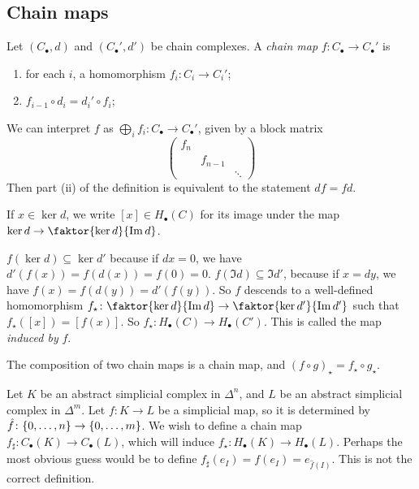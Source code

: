 \subsection{Chain maps}
\begin{definition}
	Let \( (C_\bullet, d) \) and \( (C_\bullet', d') \) be chain complexes.
	A \emph{chain map} \( f \colon C_\bullet \to C_\bullet' \) is
	\begin{enumerate}
		\item for each \( i \), a homomorphism \( f_i \colon C_i \to C_i' \);
		\item \( f_{i-1} \circ d_i = d_i' \circ f_i \);
	\end{enumerate}
\end{definition}
\begin{remark}
	We can interpret \( f \) as \( \bigoplus_i f_i \colon C_\bullet \to C_\bullet' \), given by a block matrix
	\[ \begin{pmatrix}
		f_n \\
		& f_{n-1} \\
		& & \ddots
	\end{pmatrix} \]
	Then part (ii) of the definition is equivalent to the statement \( d f = f d \).
\end{remark}
If \( x \in \ker d \), we write \( [x] \in H_\bullet(C) \) for its image under the map \( \ker d \to \faktor{\ker d}{\Im d} \).
\begin{remark}
	\( f(\ker d) \subseteq \ker d' \) because if \( dx = 0 \), we have \( d'(f(x)) = f(d(x)) = f(0) = 0 \).
	\( f(\Im d) \subseteq \Im d' \), because if \( x = dy \), we have \( f(x) = f(d(y)) = d'(f(y)) \).
	So \( f \) descends to a well-defined homomorphism \( f_\star \colon \faktor{\ker d}{\Im d} \to \faktor{\ker d'}{\Im d'} \) such that \( f_\star([x]) = [f(x)] \).
	So \( f_\star \colon H_\bullet(C) \to H_\bullet(C') \).
	This is called the map \emph{induced by} \( f \).
\end{remark}
\begin{remark}
	The composition of two chain maps is a chain map, and \( (f \circ g)_\star = f_\star \circ g_\star \).
\end{remark}
Let \( K \) be an abstract simplicial complex in \( \Delta^n \), and \( L \) be an abstract simplicial complex in \( \Delta^m \).
Let \( f \colon K \to L \) be a simplicial map, so it is determined by \( \hat f \colon \qty{0, \dots, n} \to \qty{0, \dots, m} \).
We wish to define a chain map \( f_\sharp \colon C_\bullet(K) \to C_\bullet(L) \), which will induce \( f_\star \colon H_\bullet(K) \to H_\bullet(L) \).
Perhaps the most obvious guess would be to define \( f_\sharp(e_I) = f(e_I) = e_{\hat f(I)} \).
This is not the correct definition.

